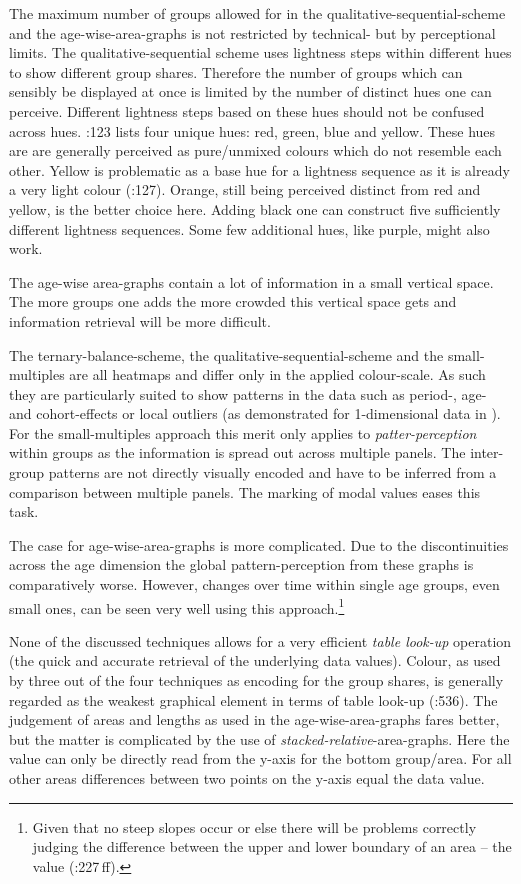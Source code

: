 \documentclass[a4paper]{scrartcl}
\begin{document}
The maximum number of groups allowed for in the qualitative-sequential-scheme and the age-wise-area-graphs is not restricted by technical- but by perceptional limits. The qualitative-sequential scheme uses lightness steps within different hues to show different group shares. Therefore the number of groups which can sensibly be displayed at once is limited by the number of distinct hues one can perceive. Different lightness steps based on these hues should not be confused across hues. \textcite{Ware2013}:123 lists four unique hues: red, green, blue and yellow. These hues are are generally perceived as pure/unmixed colours which do not resemble each other. Yellow is problematic as a base hue for a lightness sequence as it is already a very light colour (\cite{Ware2013}:127). Orange, still being perceived distinct from red and yellow, is the better choice here. Adding black one can construct five sufficiently different lightness sequences. Some few additional hues, like purple, might also work.

The age-wise area-graphs contain a lot of information in a small vertical space. The more groups one adds the more crowded this vertical space gets and information retrieval will be more difficult.

The ternary-balance-scheme, the qualitative-sequential-scheme and the small-multiples are all heatmaps and differ only in the applied colour-scale. As such they are particularly suited to show patterns in the data such as period-, age- and cohort-effects or local outliers (as demonstrated for 1-dimensional data in \cite{Vaupel1987}). For the small-multiples approach this merit only applies to \emph{patter-perception} within groups as the information is spread out across multiple panels. The inter-group patterns are not directly visually encoded and have to be inferred from a comparison between multiple panels. The marking of modal values eases this task.

The case for age-wise-area-graphs is more complicated. Due to the discontinuities across the age dimension the global pattern-perception from these graphs is comparatively worse. However, changes over time within single age groups, even small ones, can be seen very well using this approach.\footnote{Given that no steep slopes occur or else there will be problems correctly judging the difference between the upper and lower boundary of an area -- the value (\cite{Cleveland1994}:227\,ff).}

None of the discussed techniques allows for a very efficient \emph{table look-up} operation (the quick and accurate retrieval of the underlying data values). Colour, as used by three out of the four techniques as encoding for the group shares, is generally regarded as the weakest graphical element in terms of table look-up (\cite{Cleveland1984}:536). The judgement of areas and lengths as used in the age-wise-area-graphs fares better, but the matter is complicated by the use of \emph{stacked-relative}-area-graphs. Here the value can only be directly read from the y-axis for the bottom group/area. For all other areas differences between two points on the y-axis equal the data value.
\end{document}
